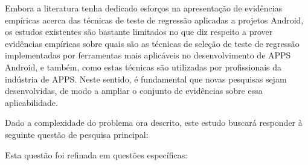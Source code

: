 
Embora a literatura tenha dedicado esforços na apresentação de evidências empíricas acerca das técnicas de teste de regressão aplicadas a projetos Android, os estudos existentes são bastante limitados no que diz respeito a prover evidências empíricas sobre quais são as técnicas de seleção de teste de regressão implementadas por ferramentas mais aplicáveis no desenvolvimento de \ac{APPS} Android, e também, como estas técnicas são utilizadas por profissionais da indústria de \ac{APPS}. Neste sentido, é fundamental que novas pesquisas sejam desenvolvidas, de modo a ampliar o conjunto de evidências sobre essa aplicabilidade.

Dado a complexidade do problema ora descrito, este estudo buscará responder à seguinte questão de pesquisa principal:
\leavevspace 

\begin{center}
    \noindent{}
\end{center}

\vspace{.5em}

Esta questão foi refinada em questões específicas:
\vspace{.5em}

